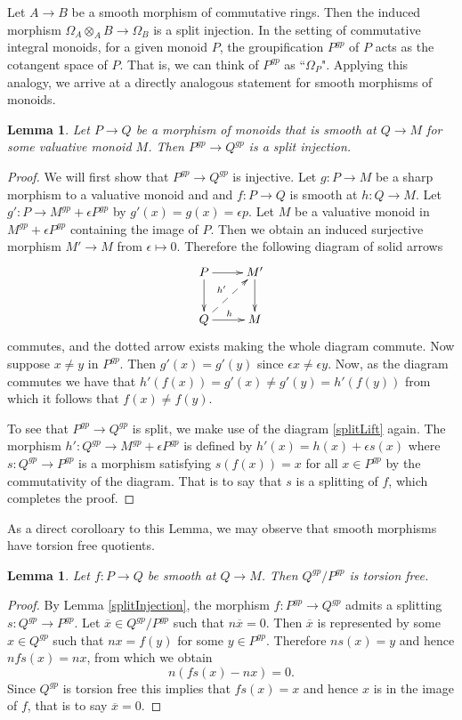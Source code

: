 \documentclass[12pt]{amsart}
\numberwithin{equation}{section}
\theoremstyle{plain}
\newtheorem{lem}[equation]{Lemma}
\theoremstyle{remark}
\begin{document}
Let $A\to B$ be a smooth morphism of commutative rings. Then the induced morphism $\Omega_A\otimes_A B\to \Omega_B$ is a split injection. In the setting of commutative integral monoids, for a given monoid $P$, the groupification $P^{gp}$ of $P$ acts as the cotangent space of $P$. That is, we can think of $P^{gp}$ as ``$\Omega_P$". Applying this analogy, we arrive at a directly analogous statement for smooth morphisms of monoids.
\begin{lem}\label{splitInjection}
	Let $P\to Q$ be a morphism of monoids that is smooth at $Q\to M$ for some valuative monoid $M$. Then $P^{gp}\to Q^{gp}$ is a split injection.
\end{lem}
\begin{proof}
	We will first show that $P^{gp}\to Q^{gp}$ is injective. Let $g:P\to M$ be a sharp morphism to a valuative monoid and and $f:P\to Q$ is smooth at $h:Q\to M$. Let $g':P\to M^{gp} + \epsilon P^{gp}$ by $g'(x) = g(x) = \epsilon p$. Let $M$ be a valuative monoid in $M^{gp} + \epsilon P^{gp}$ containing the image of $P$. Then we obtain an induced surjective morphism $M'\to M$ from $\epsilon\mapsto 0$. Therefore the following diagram of solid arrows
\begin{equation}\label{splitLift}
\xymatrix{
	P\ar[r]\ar[d] & M'\ar[d]\\
	Q\ar^{h}[r]\ar@{-->}^{h'}[ur] & M\\
	}
\end{equation}
commutes, and the dotted arrow exists making the whole diagram commute. Now suppose $x\neq y$ in $P^{gp}$. Then $g'(x) = g'(y)$ since $\epsilon x\neq \epsilon y$. Now, as the diagram commutes we have that $h'(f(x)) = g'(x) \neq g'(y) = h'(f(y))$ from which it follows that $f(x)\neq f(y)$. 

	To see that $P^{gp}\to Q^{gp}$ is split, we make use of the diagram \eqref{splitLift} again. The morphism $h': Q^{gp}\to M^{gp} + \epsilon P^{gp}$ is defined by $h'(x) = h(x) + \epsilon s(x)$ where $s:Q^{gp}\to P^{gp}$ is a morphism satisfying $s(f(x)) = x$ for all $x\in P^{gp}$ by the commutativity of the diagram. That is to say that $s$ is a splitting of $f$, which completes the proof.
\end{proof}
As a direct corolloary to this Lemma, we may observe that smooth morphisms have torsion free quotients.
\begin{lem}\label{torsionFreeQuotient}
	Let $f:P\to Q$ be smooth at $Q\to M$. Then $Q^{gp}/P^{gp}$ is torsion free.
\end{lem}
\begin{proof}
	By Lemma \eqref{splitInjection}, the morphism $f:P^{gp}\to Q^{gp}$ admits a splitting $s:Q^{gp}\to P^{gp}$. Let $\overline{x}\in Q^{gp}/P^{gp}$ such that $n\overline{x} = 0$. Then $\overline{x}$ is represented by some $x\in Q^{gp}$ such that $nx = f(y)$ for some $y\in P^{gp}$. Therefore $ns(x) = y$ and hence $nfs(x) = nx$, from which we obtain
		$$n(fs(x) - nx) = 0.$$
Since $Q^{gp}$ is torsion free this implies that $fs(x) = x$ and hence  $x$ is in the image of $f$, that is to say $\overline{x} = 0$.
\end{proof}
\end{document}
